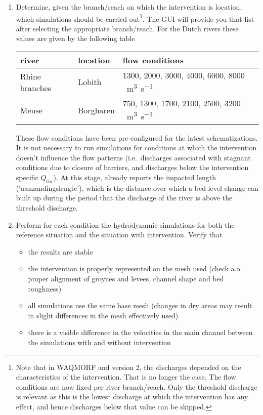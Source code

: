 \begin{enumerate}
\item Determine, given the branch/reach on which the intervention is location, which \dflowfm simulations should be carried out\footnote{Note that in WAQMORF and \dfmi version 2, the discharges depended on the characteristics of the intervention.
That is no longer the case.
The flow conditions are now fixed per river branch/reach.
Only the threshold discharge is relevant as this is the lowest discharge at which the intervention has any effect, and hence discharges below that value can be skipped.}.
The \dfmi GUI will provide you that list after selecting the appropriate branch/reach.
For the Dutch rivers these values are given by the following table
\newline
\newline
\begin{tabular}{l|l|l}
river & location & flow conditions \\ \hline
Rhine branches & Lobith & 1300, 2000, 3000, 4000, 6000, 8000 \SI{}{\metre\cubed\per\second}\\
Meuse & Borgharen & 750, 1300, 1700, 2100, 2500, 3200 \SI{}{\metre\cubed\per\second}
\end{tabular}
\newline
\newline
These flow conditions have been pre-configured for the latest \dflowfm schematizations.
It is not necessary to run simulations for conditions at which the intervention doesn't influence the flow patterns (i.e.~discharges associated with stagnant conditions due to closure of barriers, and discharges below the intervention specific $Q_\text{thr}$).
At this stage, \dfmi already reports the impacted length (`aanzandingslengte'), which is the distance over which a bed level change can built up during the period that the discharge of the river is above the threshold discharge.

\item Perform for each condition the hydrodynamic simulations for both the reference situation and the situation with intervention.
Verify that
\begin{itemize}
\item the \dflowfm results are stable
\item the intervention is properly represented on the mesh used (check a.o. proper alignment of groynes and levees, channel shape and bed roughness)
\item all simulations use the same base mesh (changes in dry areas may result in slight differences in the mesh effectively used)
\item there is a visible difference in the velocities in the main channel between the simulations with and without intervention
\end{itemize}


\end{enumerate}
